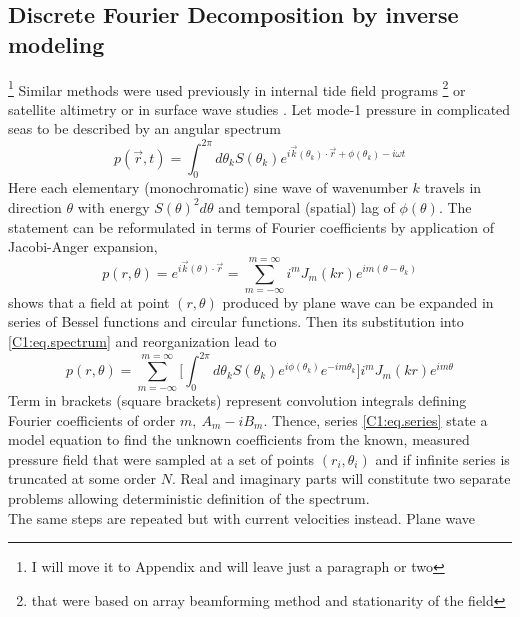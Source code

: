 \documentclass[12pt]{article}
\begin{document}
\subsection{Discrete Fourier Decomposition by inverse modeling} \footnote{I will move it to 
Appendix and will leave just a paragraph or two}
 Similar methods 
were used previously in internal tide field programs \citep{hendry1977observations, 
lozovatsky2003spatial} \footnote{that were based on array beamforming method and stationarity of 
the field} or 
satellite altimetry \citep{dushaw2002mapping} or in surface wave studies 
\citep{longuet1961observations, munk1963directional, long1986inverse}. Let 
mode-1 pressure in complicated seas to be described by an angular spectrum
\begin{equation}
\label{C1:eq.spectrum}
p(\vec{r}, t) = \int_0^{2\pi}  d\theta_k S(\theta_k) e^{i \vec{k}(\theta_k) \cdot \vec{r} + 
\phi(\theta_k) - i \omega t}
\end{equation}
Here each elementary (monochromatic) sine wave of wavenumber $k$ travels in direction $\theta$ with 
energy $S(\theta)^2 d\theta$ and temporal (spatial) lag of $\phi(\theta)$. The statement can be 
reformulated in terms of Fourier coefficients \citep{munk1963directional} by application of 
Jacobi-Anger expansion,
\begin{equation}
p(r, \theta) = e^{i \vec{k}(\theta) \cdot \vec{r}} = \sum_{m = -\infty}^{m = \infty} i^{m} J_{m}(k 
r) e^{im(\theta - \theta_k)}
\end{equation}
shows that a field at point $(r, \theta)$ produced by plane wave can be expanded in series of 
Bessel functions and circular functions. Then its substitution into \eqref{C1:eq.spectrum} and 
reorganization lead to
\begin{equation}
\label{C1:p.eq}
p(r, \theta) = \sum_{m=-\infty}^{m=\infty} \big[ \int_0^{2\pi}  d\theta_k S(\theta_k) 
e^{i\phi(\theta_k)} e^{-im\theta_k} \big] i^m J_m(kr) e^{im\theta}
\end{equation}
Term in brackets (square brackets) represent convolution integrals defining Fourier coefficients of 
order $m,~A_m - i B_m$. Thence, series \eqref{C1:eq.series} state a model equation to find the 
unknown coefficients from the known, measured pressure field that were sampled at a set of points 
$(r_i, \theta_i)$ and if infinite series is truncated at some order $N$. Real and imaginary parts 
will constitute two separate problems allowing deterministic definition of the spectrum.\\
The same steps are repeated but with current velocities instead. Plane wave  
\end{document}
